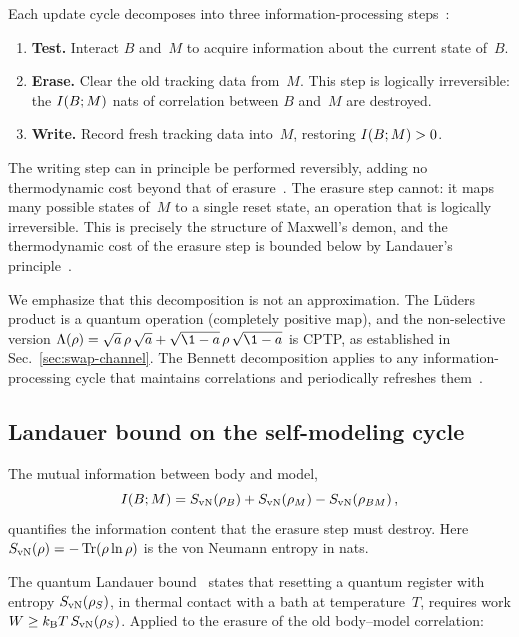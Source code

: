 Each update cycle decomposes into three information-processing
steps~\cite{Bennett1982}:
\begin{enumerate}
  \item \textbf{Test.}  Interact $B$ and~$M$ to acquire information
    about the current state of~$B$.
  \item \textbf{Erase.}  Clear the old tracking data from~$M$.
    This step is logically irreversible: the $I(B;M)$ nats of
    correlation between $B$ and~$M$ are destroyed.
  \item \textbf{Write.}  Record fresh tracking data into~$M$,
    restoring $I(B;M) > 0$.
\end{enumerate}
The writing step can in principle be performed reversibly, adding no
thermodynamic cost beyond that of erasure~\cite{Bennett1982}.  The
erasure step cannot: it maps many possible states of~$M$ to a single
reset state, an operation that is logically irreversible.  This is
precisely the structure of Maxwell's demon, and the thermodynamic
cost of the erasure step is bounded below by Landauer's
principle~\cite{Landauer1961}.

We emphasize that this decomposition is not an approximation.  The
Lüders product is a quantum operation (completely positive map),
and the non-selective version
$\Lambda(\rho) = \sqrt{a}\,\rho\,\sqrt{a}
+ \sqrt{\1-a}\,\rho\,\sqrt{\1-a}$
is CPTP, as established in Sec.~\ref{sec:swap-channel}.  The
Bennett decomposition applies to any information-processing cycle
that maintains correlations and periodically refreshes
them~\cite{Bennett1982}.

\subsection{Landauer bound on the self-modeling cycle}
\label{sec:landauer-bound}

The mutual information between body and model,
\begin{equation}
  I(B;M) = S_{\mathrm{vN}}(\rho_B) + S_{\mathrm{vN}}(\rho_M) - S_{\mathrm{vN}}(\rho_{BM}) \,,
  \label{eq:mi-def}
\end{equation}
quantifies the information content that the erasure step must
destroy.  Here $S_{\mathrm{vN}}(\rho) = -\operatorname{Tr}(\rho\ln\rho)$ is the von Neumann
entropy in nats.

The quantum Landauer bound~\cite{ReebWolf2014} states that resetting
a quantum register with entropy $S_{\mathrm{vN}}(\rho_S)$, in thermal contact
with a bath at temperature~$T$, requires work
$W \geq k_{\mathrm{B}} T\,S_{\mathrm{vN}}(\rho_S)$.
Applied to the erasure of the old body--model correlation:

